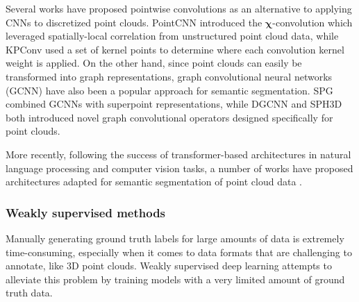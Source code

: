 Several works have proposed pointwise convolutions as an alternative to applying CNNs to discretized point clouds. PointCNN \citep{li2018pointcnn} introduced the $\bm{\chi}$-convolution which leveraged spatially-local correlation from unstructured point cloud data, while KPConv \citep{thomas2019kpconv} used a set of kernel points to determine where each convolution kernel weight is applied. On the other hand, since point clouds can easily be transformed into graph representations, graph convolutional neural networks (GCNN) have also been a popular approach for semantic segmentation. SPG \citep{landrieu2018large} combined GCNNs with superpoint representations, while DGCNN \citep{wang2019dynamic} and SPH3D \citep{lei2021spherical} both introduced novel graph convolutional operators designed specifically for point clouds.

More recently, following the success of transformer-based architectures in natural language processing and computer vision tasks, a number of works have proposed architectures adapted for semantic segmentation of point cloud data \citep{guo2021pct,zhao2021point,wu2022point,wu2024point,robert2023efficient}.

\subsubsection{Weakly supervised methods}

Manually generating ground truth labels for large amounts of data is extremely time-consuming, especially when it comes to data formats that are challenging to annotate, like 3D point clouds. Weakly supervised deep learning attempts to alleviate this problem by training models with a very limited amount of ground truth data.

